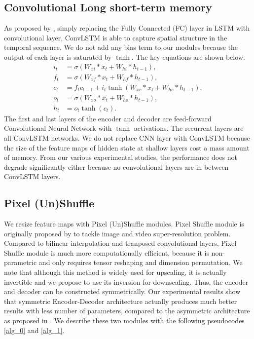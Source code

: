 \documentclass[10pt,twocolumn,letterpaper]{article}
\begin{document}
\subsection{Convolutional Long short-term memory}
As proposed by \cite{xingjian2015convolutional}, simply replacing the Fully Connected (FC) layer in LSTM with convolutional layer, ConvLSTM is able to capture spatial structure in the temporal sequence. We do not add any bias term to our modules because the output of each layer is saturated by $\tanh$. The key equations are shown below.
\begin{align}
i_t &= \sigma(W_{xi}*x_t + W_{hi}*h_{t-1}) ,\\
f_t &= \sigma(W_{xf}*x_t + W_{hf}*h_{t-1}) ,\\
c_t &= f_tc_{t-1}+i_t\tanh(W_{xc}*x_t + W_{hc}*h_{t-1}), \\
o_t &= \sigma(W_{xo}*x_t + W_{ho}*h_{t-1}) ,\\
h_t &= o_t\tanh(c_t).
\end{align}
The first and last layers of the encoder and decoder are feed-forward Convolutional Neural Network with $\tanh$ activations. The recurrent layers are all ConvLSTM networks. We do not replace CNN layer with ConvLSTM because the size of the feature maps of hidden state at shallow layers cost a mass amount of memory. From our various experimental studies, the performance does not degrade significantly either because no convolutional layers are in between ConvLSTM layers.

\subsection{Pixel (Un)Shuffle}
We resize feature maps with Pixel (Un)Shuffle modules. Pixel Shuffle module is originally proposed by \cite{shi2016real} to tackle image and video super-resolution problem. Compared to bilinear interpolation and tranposed convolutional layers, Pixel Shuffle module is much more computationally efficient, because it is non-parametric and only requires tensor reshaping and dimension permutation. We note that although this method is widely used for upscaling, it is actually invertible and we propose to use its inversion for downscaling. Thus, the encoder and decoder can be constructed symmetrically. Our experimental results show that symmetric Encoder-Decoder architecture actually produces much better results with less number of parameters, compared to the asymmetric architecture as proposed in \cite{toderici2017full}. We describe these two modules with the following pseudocodes \ref{alg_0} and \ref{alg_1}.
\end{document}
